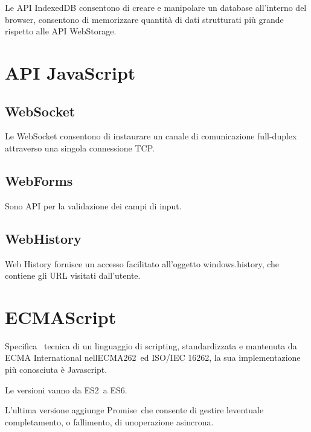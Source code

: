\documentclass[
]{article}
\begin{document}
{Le API IndexedDB consentono di creare e manipolare un database
all'interno del browser, consentono di memorizzare quantità di dati
strutturati più }{grande rispetto alle API WebStorage.}{~}

\section{\texorpdfstring{{API
JavaScript}}{API JavaScript}}\label{h.30h83gxlxmt2}

\subsection{\texorpdfstring{{WebSocket}}{WebSocket}}\label{h.uvonku9ta1zw}

{Le WebSocket consentono di instaurare un canale di comunicazione
full-duplex attraverso una singola connessione TCP.}

\subsection{\texorpdfstring{{WebForms}}{WebForms}}\label{h.x5u55blccwvv}

{Sono API per la validazione dei campi di input.}

\subsection{\texorpdfstring{{WebHistory}}{WebHistory}}\label{h.yebyddlkikrw}

{Web History fornisce un accesso facilitato all'oggetto windows.history,
che contiene gli URL visitati dall'utente.}

\section{\texorpdfstring{{ECMAScript}}{ECMAScript}}\label{h.rtfxajinca7g}

{Specifica ~tecnica di un linguaggio di scripting, standardizzata e
mantenuta da ECMA International }{nell\textquotesingle ECMA262}{~ed
ISO/IEC 16262, la sua implementazione più conosciuta è Javascript.}

{}

{Le versioni vanno da }{ES2}{~a }{ES6}{. }

{}

{L'ultima versione aggiunge }{Promise}{~che consente di gestire
l\textquotesingle eventuale completamento, o fallimento, di
un\textquotesingle operazione asincrona.}
\end{document}
